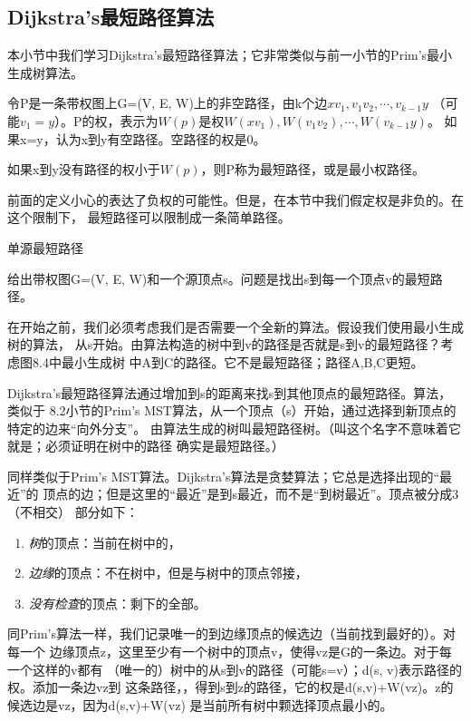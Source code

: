 \subsection{Dijkstra's最短路径算法}\label{Sec:Dijkstra}
本小节中我们学习Dijkstra's最短路径算法；它非常类似与前一小节的Prim's最小生成树算法。

\begin{definition}\vspace{1ex}
令P是一条带权图上G=(V, E, W)上的非空路径，由k个边$xv_1, v_1v_2, \cdots, v_{k-1}y$
（可能$v_1=y$）。P的权，表示为$W(p)$是权$W(xv_1), W(v_1v_2), \cdots, W(v_{k-1}y)$。
如果x=y，认为x到y有空路径。空路径的权是0。

如果x到y没有路径的权小于$W(p)$，则P称为最短路径，或是最小权路径。
\end{definition}

前面的定义小心的表达了负权的可能性。但是，在本节中我们假定权是非负的。在这个限制下，
最短路径可以限制成一条简单路径。

\begin{problem}
单源最短路径

给出带权图G=(V, E, W)和一个源顶点s。问题是找出s到每一个顶点v的最短路径。
\end{problem}

在开始之前，我们必须考虑我们是否需要一个全新的算法。假设我们使用最小生成树的算法，
从s开始。由算法构造的树中到v的路径是否就是s到v的最短路径？考虑图8.4中最小生成树
中A到C的路径。它不是最短路径；路径A,B,C更短。

Dijkstra's最短路径算法通过增加到s的距离来找s到其他顶点的最短路径。算法，类似于
8.2小节的Prim's MST算法，从一个顶点（s）开始，通过选择到新顶点的特定的边来“向外分支”。
由算法生成的树叫最短路径树。（叫这个名字不意味着它就是；必须证明在树中的路径
确实是最短路径。）

同样类似于Prim's MST算法。Dijkstra's算法是贪婪算法；它总是选择出现的“最近”的
顶点的边；但是这里的“最近”是到s最近，而不是“到树最近”。顶点被分成3（不相交）
部分如下：
\begin{enumerate}
\item \emph{树}的顶点：当前在树中的，
\item \emph{边缘}的顶点：不在树中，但是与树中的顶点邻接，
\item \emph{没有检查}的顶点：剩下的全部。
\end{enumerate}
同Prim's算法一样，我们记录唯一的到边缘顶点的候选边（当前找到最好的）。对每一个
边缘顶点z，这里至少有一个树中的顶点v，使得vz是G的一条边。对于每一个这样的v都有
（唯一的）树中的从s到v的路径（可能s=v）；d(s, v)表示路径的权。添加一条边vz到
这条路径，，得到s到z的路径，它的权是d(s,v)+W(vz)。z的候选边是vz，因为d(s,v)+W(vz)
是当前所有树中颗选择顶点最小的。


